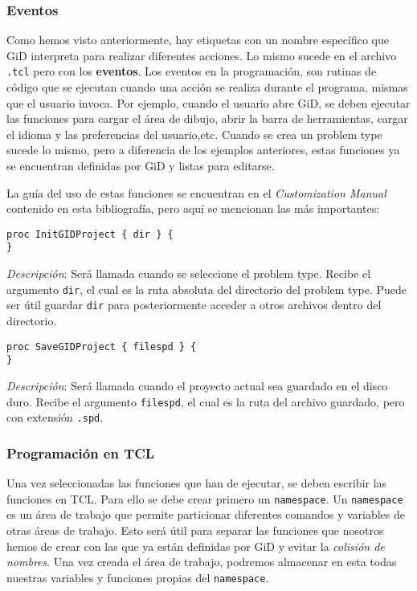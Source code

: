 \documentclass[10pt, a4paper, twocolumn]{article} %
\begin{document}
\subsubsection{Eventos}
\label{sec:eventosGiD}
Como hemos visto anteriormente, hay etiquetas con un nombre específico que GiD interpreta para realizar diferentes acciones. Lo mismo sucede en el archivo \texttt{.tcl} pero con los \textbf{eventos}. Los eventos en la programación, son rutinas de código que se ejecutan cuando una acción se realiza durante el programa, mismas que el usuario invoca. Por ejemplo, cuando el usuario abre GiD, se deben ejecutar las funciones para cargar el área de dibujo, abrir la barra de herramientas, cargar el idioma y las preferencias del usuario,etc. Cuando se crea un problem type sucede lo mismo, pero a diferencia de los ejemplos anteriores, estas funciones ya se encuentran definidas por GiD y listas para editarse.

La guía del uso de estas funciones se encuentran en el \textit{Customization Manual} contenido en esta bibliografía, pero aquí se mencionan las más importantes:

\lstset{language=tcl} 
\begin{lstlisting}
proc InitGIDProject { dir } {
}
\end{lstlisting}

\textit{Descripción}: Será llamada cuando se seleccione el problem type. Recibe el argumento \texttt{dir}, el cual es la ruta absoluta del directorio del problem type. Puede ser útil guardar \texttt{dir} para posteriormente  acceder a otros archivos dentro del directorio.

\begin{lstlisting}
proc SaveGIDProject { filespd } {
}
\end{lstlisting}

\textit{Descripción}: Será llamada cuando el proyecto actual sea guardado en el disco duro. Recibe el argumento \texttt{filespd}, el cual es la ruta del archivo guardado, pero con extensión \texttt{.spd}.

\subsubsection{Programación en TCL}

Una vez seleccionadas las funciones que han de ejecutar, se deben escribir las funciones en TCL. Para ello se debe crear primero un \texttt{namespace}. Un \texttt{namespace} es un área de trabajo que permite particionar diferentes comandos y variables de otras áreas de trabajo. Esto será útil para separar las funciones que nosotros hemos de crear con las que ya están definidas por GiD y evitar la \textit{colisión de nombres}. Una vez creada el área de trabajo, podremos almacenar en esta todas nuestras variables y funciones propias del \texttt{namespace}.
\end{document}
